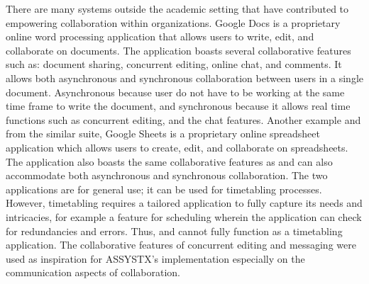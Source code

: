 There are many systems outside the academic setting that have contributed to empowering collaboration within organizations. Google Docs \citep{googleDocs} is a proprietary online word processing application that allows users to write, edit, and collaborate on documents. The application boasts several collaborative features such as: document sharing, concurrent editing, online chat, and comments. It allows both asynchronous and synchronous collaboration between users in a single document. Asynchronous because user do not have to be working at the same time frame to write the document, and synchronous because it allows real time functions such as concurrent editing, and the chat features. Another example and from the similar suite, Google Sheets \cite{googleSheets} is a proprietary online spreadsheet application which allows users to create, edit, and collaborate on spreadsheets. The application also boasts the same collaborative features as \cite{googleDocs} and can also accommodate both asynchronous and synchronous collaboration. The two applications are for general use; it can be used for timetabling processes. However, timetabling requires a tailored application to fully capture its needs and intricacies, for example a feature for scheduling wherein the application can check for redundancies and errors. Thus, \cite{googleDocs} and \cite{googleSheets} cannot fully function as a timetabling application. The collaborative features of concurrent editing and messaging were used as inspiration for ASSYSTX's implementation especially on the communication aspects of collaboration. 



